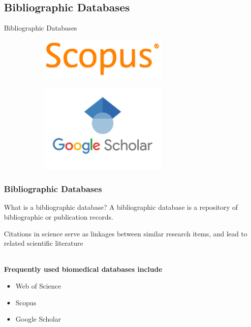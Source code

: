 \documentclass{beamer}
\begin{document}
\subsection{Bibliographic Databases}
\begin{frame}
    \begin{center}
        {\huge Bibliographic Databases}
    \end{center}
    \begin{figure}[h]
        \begin{subfigure}{0.49\textwidth}
            \centering
            \includegraphics[width=0.7\textwidth]{scopus.png}
        \end{subfigure}
        \begin{subfigure}{0.49\textwidth}
            \centering
            \includegraphics[width=0.7\textwidth]{gs.png}
        \end{subfigure}
    \end{figure}
\end{frame}
\begin{frame}
    \frametitle{Bibliographic Databases}

    \begin{block}{What is a bibliographic database?}
        A bibliographic database is a repository of bibliographic or publication records.
    \end{block}

    Citations in science serve as linkages between similar research items, and lead to related scientific literature\\~\

    \textbf{Frequently used biomedical databases include}
    \begin{itemize}
        \item Web of Science
        \item Scopus
        \item Google Scholar
    \end{itemize}
\end{frame}
\end{document}
